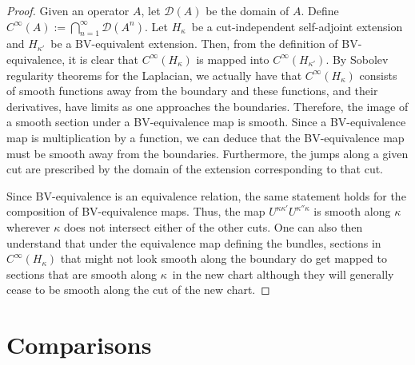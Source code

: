 \documentclass[11pt]{article}
\theoremstyle{remark}
\begin{document}
\begin{proof}
Given an operator $A$,  let $\ensuremath{\mathcal{D}}(A)$ be the domain of $A$. Define
$\ensuremath{C^{\infty}}(A) \ensuremath{:=} \bigcap_{n=1}^{\infty} \ensuremath{\mathcal{D}}(A^n)$. Let \ensuremath{H_{\ensuremath{\kappa}}}\ be a
cut-independent self-adjoint extension and \ensuremath{H_{\ensuremath{\kappa'}}}\ be a BV-equivalent
extension. Then, from the definition of BV-equivalence, it is clear that
$\ensuremath{C^{\infty}}(\ensuremath{H_{\ensuremath{\kappa}}})$ is mapped into $\ensuremath{C^{\infty}}(\ensuremath{H_{\ensuremath{\kappa'}}})$. By Sobolev regularity
theorems for the Laplacian, we actually have that $\ensuremath{C^{\infty}}(\ensuremath{H_{\ensuremath{\kappa}}})$
consists of smooth functions away from the boundary and these
functions, and their derivatives, have limits as one approaches the
boundaries. Therefore, the image of a smooth section under a 
BV-equivalence map  is smooth. 
Since a BV-equivalence map is multiplication by a
function, we can deduce that the
BV-equivalence map must be smooth away from the boundaries. Furthermore,
the jumps along a given cut are prescribed by the domain of the extension 
corresponding to that cut. 

Since BV-equivalence is an equivalence relation, the same statement
holds for the composition of BV-equivalence maps. Thus, the map
$\ensuremath{U^{\ensuremath{\kappa}{}  \ensuremath{\kappa}{'}}} \ensuremath{U^{\ensuremath{\kappa}{''}  \ensuremath{\kappa}{}}}$ is smooth along $\ensuremath{\kappa}$ wherever $\ensuremath{\kappa}$ does
not intersect either of the other cuts. One can also then understand
that under the equivalence map defining the bundles, sections in
$\ensuremath{C^{\infty}}(\ensuremath{H_{\ensuremath{\kappa}}})$ that
might not look smooth along the boundary do get mapped to sections
that are smooth along \ensuremath{\kappa}\ in the new chart although they will
generally cease to be smooth along the cut of the new chart. 

\end{proof}


\section{Comparisons} {\label{s:comp}}
\end{document}
